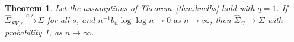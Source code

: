 \documentclass[11pt]{article}
\newtheorem{theorem}{Theorem}
\theoremstyle{remark}
\newtheorem{ass}{Assumption}
\begin{document}


\begin{theorem}
\label{th:consistency}
 Let the assumptions of Theorem~\ref{thm:kuelbs} hold with $q = 1$. If $\hat{\Sigma}_{SV,s} \xrightarrow{a.s.} \Sigma$ for all $s$, and $n^{-1}{b_n \log \log n} \to 0 \textrm{ as } n \to \infty$, then $\hat{\Sigma}_{G} \to \Sigma$ with probability 1, as $n \to \infty$.
\end{theorem} 


\end{document}
